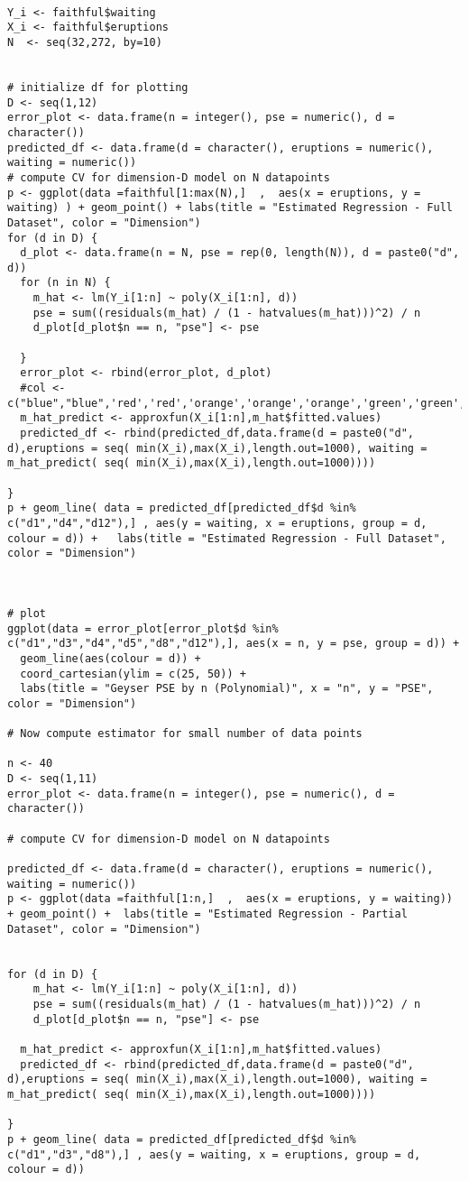 
\begin{verbatim}

Y_i <- faithful$waiting
X_i <- faithful$eruptions
N  <- seq(32,272, by=10)


# initialize df for plotting
D <- seq(1,12)
error_plot <- data.frame(n = integer(), pse = numeric(), d = character())
predicted_df <- data.frame(d = character(), eruptions = numeric(), waiting = numeric())
# compute CV for dimension-D model on N datapoints
p <- ggplot(data =faithful[1:max(N),]  ,  aes(x = eruptions, y = waiting) ) + geom_point() + labs(title = "Estimated Regression - Full Dataset", color = "Dimension") 
for (d in D) {
  d_plot <- data.frame(n = N, pse = rep(0, length(N)), d = paste0("d", d))
  for (n in N) {
    m_hat <- lm(Y_i[1:n] ~ poly(X_i[1:n], d))
    pse = sum((residuals(m_hat) / (1 - hatvalues(m_hat)))^2) / n
    d_plot[d_plot$n == n, "pse"] <- pse
    
  }
  error_plot <- rbind(error_plot, d_plot)
  #col <- c("blue","blue",'red','red','orange','orange','orange','green','green','green','green','green')
  m_hat_predict <- approxfun(X_i[1:n],m_hat$fitted.values)
  predicted_df <- rbind(predicted_df,data.frame(d = paste0("d", d),eruptions = seq( min(X_i),max(X_i),length.out=1000), waiting =  m_hat_predict( seq( min(X_i),max(X_i),length.out=1000))))
  
}
p + geom_line( data = predicted_df[predicted_df$d %in% c("d1","d4","d12"),] , aes(y = waiting, x = eruptions, group = d, colour = d)) +   labs(title = "Estimated Regression - Full Dataset", color = "Dimension")



# plot
ggplot(data = error_plot[error_plot$d %in% c("d1","d3","d4","d5","d8","d12"),], aes(x = n, y = pse, group = d)) + 
  geom_line(aes(colour = d)) +
  coord_cartesian(ylim = c(25, 50)) +
  labs(title = "Geyser PSE by n (Polynomial)", x = "n", y = "PSE", color = "Dimension")

# Now compute estimator for small number of data points

n <- 40
D <- seq(1,11)
error_plot <- data.frame(n = integer(), pse = numeric(), d = character())

# compute CV for dimension-D model on N datapoints

predicted_df <- data.frame(d = character(), eruptions = numeric(), waiting = numeric())
p <- ggplot(data =faithful[1:n,]  ,  aes(x = eruptions, y = waiting)) + geom_point() +  labs(title = "Estimated Regression - Partial Dataset", color = "Dimension")


for (d in D) {
    m_hat <- lm(Y_i[1:n] ~ poly(X_i[1:n], d))
    pse = sum((residuals(m_hat) / (1 - hatvalues(m_hat)))^2) / n
    d_plot[d_plot$n == n, "pse"] <- pse
    
  m_hat_predict <- approxfun(X_i[1:n],m_hat$fitted.values)
  predicted_df <- rbind(predicted_df,data.frame(d = paste0("d", d),eruptions = seq( min(X_i),max(X_i),length.out=1000), waiting =  m_hat_predict( seq( min(X_i),max(X_i),length.out=1000))))
  
}
p + geom_line( data = predicted_df[predicted_df$d %in% c("d1","d3","d8"),] , aes(y = waiting, x = eruptions, group = d, colour = d))


\end{verbatim}
